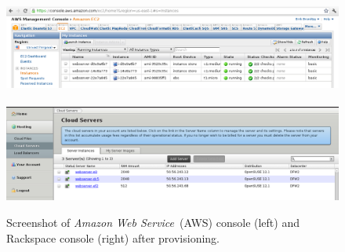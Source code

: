 \begin{figure}[tb]
  \begin{center}
    \includegraphics[width=20cm, angle=90]{imgs/aws-console.png}
    ~ ~ ~
    ~ ~ ~
    \includegraphics[width=20cm, angle=90]{imgs/rackspace-console.png}
    \caption{Screenshot of \emph{Amazon Web Service}~(AWS) console (left) and Rackspace console (right) after provisioning.}
  \end{center}
  \label{fig:validation-consoles}
\end{figure}
